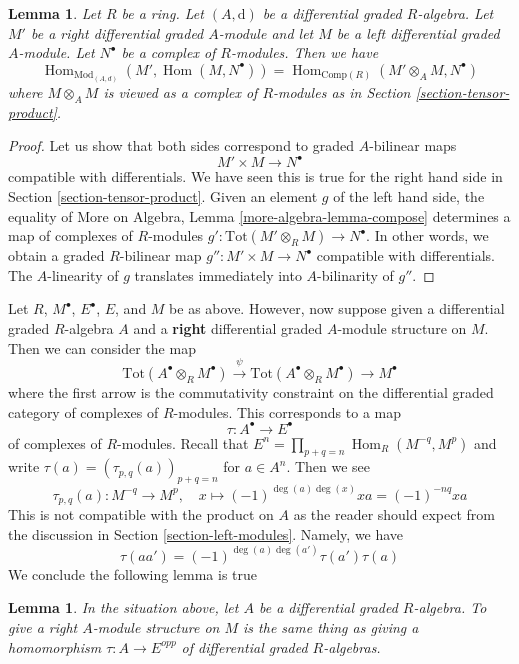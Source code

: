 \documentclass{stacks-project}
\theoremstyle{plain}
\newtheorem{lemma}[subsection]{Lemma}
\theoremstyle{definition}
\theoremstyle{remark}
\numberwithin{equation}{subsection}
\def\Hom{\mathop{\mathrm{Hom}}\nolimits}
\begin{document}
\begin{lemma}
\label{lemma-characterize-hom}
Let $R$ be a ring. Let $(A, \text{d})$ be a differential graded $R$-algebra.
Let $M'$ be a right differential graded $A$-module and let
$M$ be a left differential graded $A$-module.
Let $N^\bullet$ be a complex of $R$-modules. Then we have
$$
\Hom_{\text{Mod}_{(A, d)}}(M', \Hom(M, N^\bullet)) =
\Hom_{\text{Comp}(R)}(M' \otimes_A M, N^\bullet)
$$
where $M \otimes_A M$ is viewed as a complex of $R$-modules
as in Section \ref{section-tensor-product}.
\end{lemma}

\begin{proof}
Let us show that both sides correspond to graded $A$-bilinear maps
$$
M' \times M \longrightarrow N^\bullet
$$
compatible with differentials. We have seen this is true for the right
hand side in Section \ref{section-tensor-product}. Given an element
$g$ of the left hand side, the equality of
More on Algebra, Lemma \ref{more-algebra-lemma-compose}
determines a map of complexes of $R$-modules
$g' : \text{Tot}(M' \otimes_R M) \to N^\bullet$.
In other words, we obtain a graded $R$-bilinear
map $g'' : M' \times M \to N^\bullet$ compatible with differentials.
The $A$-linearity of $g$ translates immediately
into $A$-bilinarity of $g''$.
\end{proof}

\noindent
Let $R$, $M^\bullet$, $E^\bullet$, $E$, and $M$ be as above.
However, now suppose given a differential graded $R$-algebra $A$
and a {\bf right} differential graded $A$-module structure on $M$.
Then we can consider the map
$$
\text{Tot}(A^\bullet \otimes_R M^\bullet)
\xrightarrow{\psi}
\text{Tot}(A^\bullet \otimes_R M^\bullet)
\to
M^\bullet
$$
where the first arrow is the commutativity constraint on the
differential graded category of complexes of $R$-modules.
This corresponds to a map
$$
\tau : A^\bullet \longrightarrow E^\bullet
$$
of complexes of $R$-modules. Recall that
$E^n = \prod_{p + q = n} \Hom_R(M^{-q}, M^p)$
and write $\tau(a) = (\tau_{p, q}(a))_{p + q = n}$ for $a \in A^n$.
Then we see
$$
\tau_{p, q}(a) : M^{-q} \longrightarrow M^p,\quad
x \longmapsto (-1)^{\deg(a)\deg(x)}x a = (-1)^{-nq}xa
$$
This is not compatible with the product on $A$ as the reader should
expect from the discussion in Section \ref{section-left-modules}.
Namely, we have
$$
\tau(a a') = (-1)^{\deg(a)\deg(a')}\tau(a') \tau(a)
$$
We conclude the following lemma is true

\begin{lemma}
\label{lemma-right-module-structure}
In the situation above, let $A$ be a differential graded $R$-algebra.
To give a right $A$-module structure on $M$ is the same thing as
giving a homomorphism $\tau : A \to E^{opp}$
of differential graded $R$-algebras.
\end{lemma}
\end{document}

